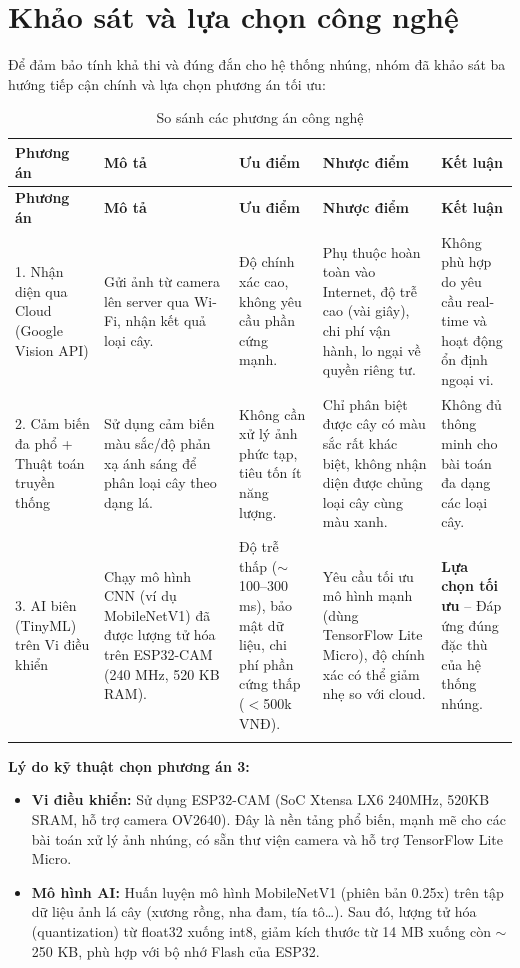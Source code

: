\documentclass[12pt,a4paper]{report}
\begin{document}
\section{Khảo sát và lựa chọn công nghệ}

Để đảm bảo tính khả thi và đúng đắn cho hệ thống nhúng, nhóm đã khảo sát
ba hướng tiếp cận chính và lựa chọn phương án tối ưu:

\begin{longtable}{|p{2.5cm}|p{3cm}|p{2.5cm}|p{3cm}|p{2.5cm}|}
\hline
\textbf{Phương án} & \textbf{Mô tả} & \textbf{Ưu điểm} & \textbf{Nhược điểm} & \textbf{Kết luận} \\
\hline
\endfirsthead
\hline
\textbf{Phương án} & \textbf{Mô tả} & \textbf{Ưu điểm} & \textbf{Nhược điểm} & \textbf{Kết luận} \\
\hline
\endhead
1. Nhận diện qua Cloud (Google Vision API) &
Gửi ảnh từ camera lên server qua Wi-Fi, nhận kết quả loại cây. &
Độ chính xác cao, không yêu cầu phần cứng mạnh. &
Phụ thuộc hoàn toàn vào Internet, độ trễ cao (vài giây), chi phí vận hành, lo ngại về quyền riêng tư. &
Không phù hợp do yêu cầu real-time và hoạt động ổn định ngoại vi. \\
\hline
2. Cảm biến đa phổ + Thuật toán truyền thống &
Sử dụng cảm biến màu sắc/độ phản xạ ánh sáng để phân loại cây theo dạng lá. &
Không cần xử lý ảnh phức tạp, tiêu tốn ít năng lượng. &
Chỉ phân biệt được cây có màu sắc rất khác biệt, không nhận diện được chủng loại cây cùng màu xanh. &
Không đủ thông minh cho bài toán đa dạng các loại cây. \\
\hline
3. AI biên (TinyML) trên Vi điều khiển &
Chạy mô hình CNN (ví dụ MobileNetV1) đã được lượng tử hóa trên ESP32-CAM (240 MHz, 520 KB RAM). &
Độ trễ thấp ($\sim$100--300 ms), bảo mật dữ liệu, chi phí phần cứng thấp ($<$500k VNĐ). &
Yêu cầu tối ưu mô hình mạnh (dùng TensorFlow Lite Micro), độ chính xác có thể giảm nhẹ so với cloud. &
\textbf{Lựa chọn tối ưu} -- Đáp ứng đúng đặc thù của hệ thống nhúng. \\
\hline
\caption{So sánh các phương án công nghệ}
\end{longtable}

\textbf{Lý do kỹ thuật chọn phương án 3:}

\begin{itemize}
    \item \textbf{Vi điều khiển:} Sử dụng ESP32-CAM (SoC Xtensa LX6 240MHz,
    520KB SRAM, hỗ trợ camera OV2640). Đây là nền tảng phổ biến, mạnh mẽ cho
    các bài toán xử lý ảnh nhúng, có sẵn thư viện camera và hỗ trợ TensorFlow
    Lite Micro.

    \item \textbf{Mô hình AI:} Huấn luyện mô hình MobileNetV1 (phiên bản 0.25x)
    trên tập dữ liệu ảnh lá cây (xương rồng, nha đam, tía tô\ldots). Sau đó,
    lượng tử hóa (quantization) từ float32 xuống int8, giảm kích thước từ 14 MB
    xuống còn $\sim$250 KB, phù hợp với bộ nhớ Flash của ESP32.
\end{itemize}
\end{document}
